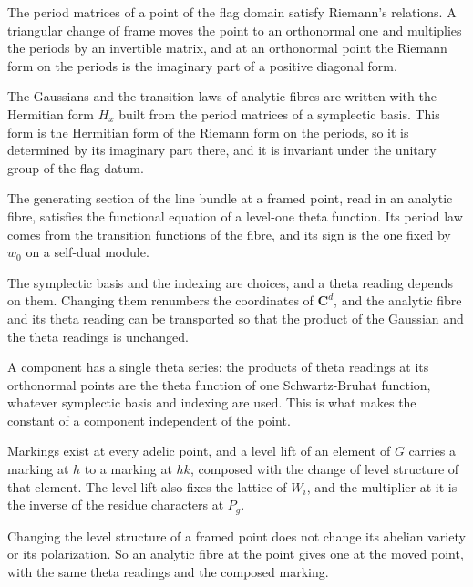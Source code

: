 The period matrices of a point of the flag domain satisfy Riemann's relations. A triangular change of frame
moves the point to an orthonormal one and multiplies the periods by an invertible matrix, and at an
orthonormal point the Riemann form on the periods is the imaginary part of a positive diagonal form.

The Gaussians and the transition laws of analytic fibres are written with the Hermitian form $H_x$ built
from the period matrices of a symplectic basis. This form is the Hermitian form of the Riemann form on the
periods, so it is determined by its imaginary part there, and it is invariant under the unitary group of
the flag datum.

The generating section of the line bundle at a framed point, read in an analytic fibre, satisfies the
functional equation of a level-one theta function. Its period law comes from the transition functions of
the fibre, and its sign is the one fixed by $w_0$ on a self-dual module.

The symplectic basis and the indexing are choices, and a theta reading depends on them. Changing them
renumbers the coordinates of $\mathbf C^d$, and the analytic fibre and its theta reading can be transported
so that the product of the Gaussian and the theta readings is unchanged.

A component has a single theta series: the products of theta readings at its orthonormal points are the
theta function of one Schwartz-Bruhat function, whatever symplectic basis and indexing are used. This is
what makes the constant of a component independent of the point.

Markings exist at every adelic point, and a level lift of an element of $G$ carries a marking at $h$ to a
marking at $hk$, composed with the change of level structure of that element. The level lift also fixes the
lattice of $W_i$, and the multiplier at it is the inverse of the residue characters at $P_g$.

Changing the level structure of a framed point does not change its abelian variety or its polarization. So
an analytic fibre at the point gives one at the moved point, with the same theta readings and the composed
marking.

